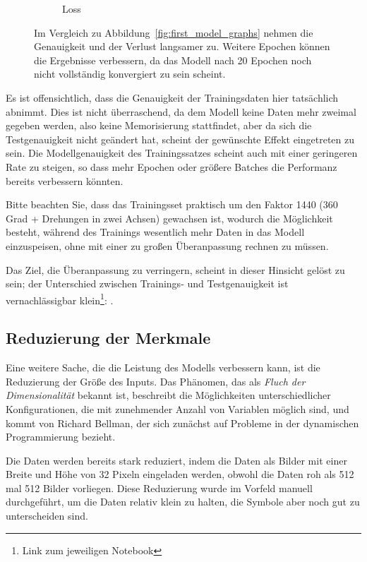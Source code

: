 \begin{figure}
\begin{subfigure}[b]{0.4\textwidth}
        \caption{Loss}
        \label{fig:first_model_data_augmentation_loss}
    \end{subfigure}
    \caption[Training nach Augmentierung der Daten]{Im Vergleich zu Abbildung~\ref{fig:first_model_graphs} nehmen die Genauigkeit und der Verlust langsamer zu. Weitere Epochen können die Ergebnisse verbessern, da das Modell nach 20 Epochen noch nicht vollständig konvergiert zu sein scheint.}
    \label{fig:first_model_data_augmentation_graphs}
\end{figure}

Es ist offensichtlich, dass die Genauigkeit der Trainingsdaten hier tatsächlich abnimmt.
Dies ist nicht überraschend, da dem Modell keine Daten mehr zweimal gegeben werden, also keine Memorisierung stattfindet, aber da sich die Testgenauigkeit nicht geändert hat, scheint der gewünschte Effekt eingetreten zu sein.
Die Modellgenauigkeit des Trainingssatzes scheint auch mit einer geringeren Rate zu steigen, so dass mehr Epochen oder größere Batches die Performanz bereits verbessern könnten.

Bitte beachten Sie, dass das Trainingsset praktisch um den Faktor 1440 (360 Grad + Drehungen in zwei Achsen) gewachsen ist, wodurch die Möglichkeit besteht, während des Trainings wesentlich mehr Daten in das Modell einzuspeisen, ohne mit einer zu großen Überanpassung rechnen zu müssen.

Das Ziel, die Überanpassung zu verringern, scheint in dieser Hinsicht gelöst zu sein; der Unterschied zwischen Trainings- und Testgenauigkeit ist vernachlässigbar klein{\footnote{Link zum jeweiligen Notebook}: }.

\subsection{Reduzierung der Merkmale}

Eine weitere Sache, die die Leistung des Modells verbessern kann, ist die Reduzierung der Größe des Inputs.
Das Phänomen, das als \textit{Fluch der Dimensionalität} bekannt ist, beschreibt die Möglichkeiten unterschiedlicher Konfigurationen, die mit zunehmender Anzahl von Variablen möglich sind, und kommt von Richard Bellman, der sich zunächst auf Probleme in der dynamischen Programmierung \cite[p.ix]{Bellman1957} bezieht.

Die Daten werden bereits stark reduziert, indem die Daten als Bilder mit einer Breite und Höhe von 32 Pixeln eingeladen werden, obwohl die Daten roh als 512 mal 512 Bilder vorliegen. Diese Reduzierung wurde im Vorfeld manuell durchgeführt, um die Daten relativ klein zu halten, die Symbole aber noch gut zu unterscheiden sind.

